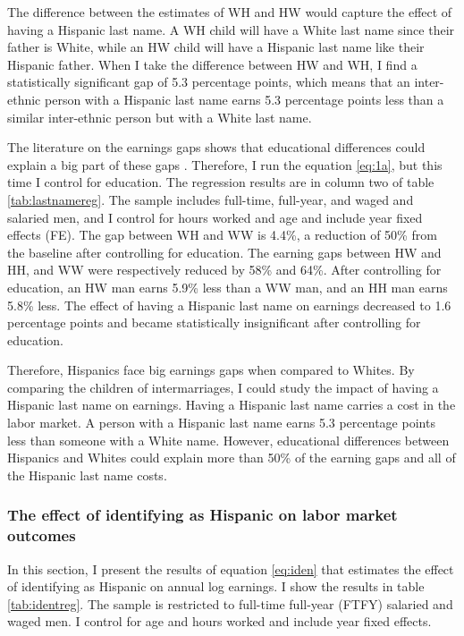 \documentclass[12pt, fullpage]{article}
\begin{document}
The difference between the estimates of WH and HW would capture the effect of having a Hispanic last name. A WH child will have a White last name since their father is White, while an HW child will have a Hispanic last name like their Hispanic father. When I take the difference between HW and WH, I find a statistically significant gap of 5.3 percentage points, which means that an inter-ethnic person with a Hispanic last name earns 5.3 percentage points less than a similar inter-ethnic person but with a White last name.

The literature on the earnings gaps shows that educational differences could explain a big part of these gaps \citep{duncan2006hispanics, duncan2017complexity, duncan2018identifying, duncan2020new}. Therefore, I run the equation \ref{eq:1a}, but this time I control for education. The regression results are in column two of table \ref{tab:lastnamereg}. The sample includes full-time, full-year, and waged and salaried men, and I control for hours worked and age and include year fixed effects (FE). The gap between WH and WW is 4.4\%, a reduction of 50\% from the baseline after controlling for education. The earning gaps between HW and HH, and WW were respectively reduced by 58\% and 64\%. After controlling for education, an HW man earns 5.9\% less than a WW man, and an HH man earns 5.8\% less. The effect of having a Hispanic last name on earnings decreased to 1.6 percentage points and became statistically insignificant after controlling for education.


Therefore, Hispanics face big earnings gaps when compared to Whites. By comparing the children of intermarriages, I could study the impact of having a Hispanic last name on earnings. Having a Hispanic last name carries a cost in the labor market. A person with a Hispanic last name earns 5.3 percentage points less than someone with a White name. However, educational differences between Hispanics and Whites could explain more than 50\% of the earning gaps and all of the Hispanic last name costs.

\subsubsection{The effect of identifying as Hispanic on labor market outcomes}

In this section, I present the results of equation \ref{eq:iden} that estimates the effect of identifying as Hispanic on annual log earnings. I show the results in table \ref{tab:identreg}. The sample is restricted to full-time full-year (FTFY) salaried and waged men. I control for age and hours worked and include year fixed effects.
\end{document}
